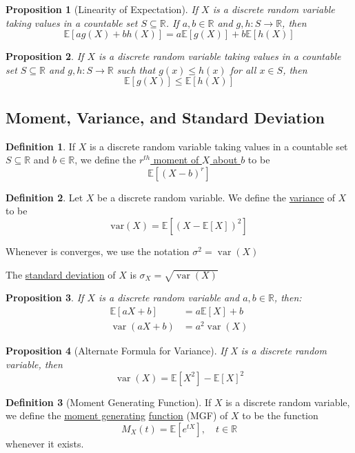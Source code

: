 \documentclass[
]{article}
\newtheorem{proposition}{Proposition}[section]
\theoremstyle{definition}
\newtheorem{definition}{Definition}[section]
\theoremstyle{definition}
\theoremstyle{definition}
\theoremstyle{remark}
\newcommand{\R}{\mathbb{R}}
\newcommand{\E}[1]{\mathbb{E}[#1]}
\newcommand{\varx}{\operatorname{var}(X)}
\newcommand{\var}[1]{\operatorname{var}\left(#1\right)}
\newcommand{\sse}{\subseteq}
\begin{document}
\begin{proposition}[Linearity of Expectation]
  If $X$ is a discrete random variable taking values in a countable set $S\sse\R$. If $a,b\in\R$ and $g,h:S\to\R$, then
  \[\E{ag(X)+bh(X)}=a\E{g(X)}+b\E{h(X)}\]
\end{proposition}

\begin{proposition}
  If $X$ is a discrete random variable taking values in a countable set $S\sse\R$ and $g,h:S\to\R$ such that $g(x)\leq h(x)$ for all $x\in S$, then
  \[\E{g(X)}\leq\E{h(X)}\]
\end{proposition}

\subsection{Moment, Variance, and Standard Deviation}

\begin{definition}
  If $X$ is a discrete random variable taking values in a countable set $S\subseteq \R$ and $b\in\R$, we define the \underline{$r^{th}$ moment of $X$ about $b$} to be\[\E{(X-b)^r}\]
\end{definition}

\begin{definition}
  Let $X$ be a discrete random variable. We define the \underline{variance} of $X$ to be \[\text{var}(X)=\E{(X-\E{X})^2}\]

  Whenever is converges, we use the notation $\sigma^2=\varx$

  The \underline{standard deviation} of $X$ is $\sigma_X=\sqrt{\var X}$
\end{definition}

\begin{proposition}
  If $X$ is a discrete random variable and $a,b\in\R$, then:
  \begin{align*}
    \E{aX+b}   & =a\E{X}+b \\
    \var{aX+b} & =a^2\varx
  \end{align*}
\end{proposition}

\begin{proposition}[Alternate Formula for Variance]
  If X is a discrete random variable, then \[\varx=\E{X^2}-\E{X}^2\]
\end{proposition}

\begin{definition}[Moment Generating Function]
  If $X$ is a discrete random variable, we define the \underline{moment generating} \underline{function} (MGF) of $X$ to be the function \[M_X(t)=\E{e^{tX}},\quad t\in\R\] whenever it exists.
\end{definition}
\end{document}
